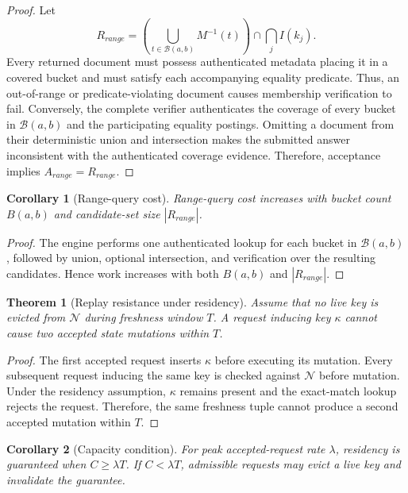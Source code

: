 \documentclass[journal]{IEEEtran}
\theoremstyle{tight}
\newtheorem{corollary}{Corollary}
\newtheorem{theorem}{Theorem}
\theoremstyle{remark}
\theoremstyle{plain}
\begin{document}
\begin{proof}
Let
\[
R_{range}=
\left(\bigcup_{t\in\mathcal B(a,b)}M^{-1}(t)\right)
\cap\bigcap_j I(k_j).
\]
Every returned document must possess authenticated metadata placing it in a covered bucket and must satisfy each accompanying equality predicate. Thus, an out-of-range or predicate-violating document causes membership verification to fail. Conversely, the complete verifier authenticates the coverage of every bucket in \(\mathcal B(a,b)\) and the participating equality postings. Omitting a document from their deterministic union and intersection makes the submitted answer inconsistent with the authenticated coverage evidence. Therefore, acceptance implies \(A_{range}=R_{range}\).
\end{proof}

\begin{corollary}[Range-query cost]
\label{cor:rangecost}
Range-query cost increases with bucket count \(B(a,b)\) and candidate-set size \(|R_{range}|\).
\end{corollary}

\begin{proof}
The engine performs one authenticated lookup for each bucket in \(\mathcal B(a,b)\), followed by union, optional intersection, and verification over the resulting candidates. Hence work increases with both \(B(a,b)\) and \(|R_{range}|\).
\end{proof}

\begin{theorem}[Replay resistance under residency]
\label{thm:replay}
Assume that no live key is evicted from \(\mathcal{N}\) during freshness window \(T\). A request inducing key \(\kappa\) cannot cause two accepted state mutations within \(T\).
\end{theorem}

\begin{proof}
The first accepted request inserts \(\kappa\) before executing its mutation. Every subsequent request inducing the same key is checked against \(\mathcal N\) before mutation. Under the residency assumption, \(\kappa\) remains present and the exact-match lookup rejects the request. Therefore, the same freshness tuple cannot produce a second accepted mutation within \(T\).
\end{proof}

\begin{corollary}[Capacity condition]
\label{cor:evict}
For peak accepted-request rate \(\lambda\), residency is guaranteed when \(C\geq\lambda T\). If \(C<\lambda T\), admissible requests may evict a live key and invalidate the guarantee.
\end{corollary}
\end{document}
